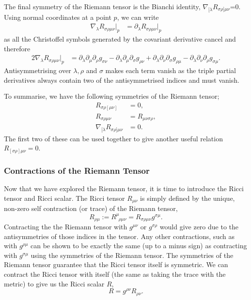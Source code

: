 The final symmetry of the Riemann tensor is the Bianchi identity, $\nabla_{[\lambda}R_{\sigma\rho]\mu\nu}$=0. Using normal coordinates at a point $p$, we can write
\begin{align}
\nabla_\lambda R_{\sigma\rho\mu\nu}\big|_p &= \partial_\lambda R_{\sigma\rho\mu\nu}\big|_p
\end{align}
as all the Christoffel symbols generated by the covariant derivative cancel and therefore
\begin{align}
2\nabla_\lambda R_{\sigma\rho\mu\nu}\big|_p &= \partial_\lambda \partial_{\mu} \partial_\rho g_{\sigma\nu} - \partial_\lambda \partial_{\mu} \partial_\sigma g_{\rho\nu} + \partial_\lambda \partial_{\nu} \partial_\sigma g_{\rho\mu} - \partial_\lambda \partial_{\nu} \partial_\rho g_{\sigma\mu}.
\end{align}
Antisymmetrising over $\lambda,\rho$ and $\sigma$ makes each term vanish as the triple partial derivatives always contain two of the antisymmetrised indices and must vanish.

To summarise, we have the following symmetries of the Riemann tensor; 
\begin{align}
R_{\sigma\rho[\mu\nu]}&=0, \\
R_{\sigma\rho\mu\nu}&=R_{\mu\nu\sigma\rho},\\
\nabla_{[\lambda}R_{\sigma\rho]\mu\nu}&=0. \label{intro:eq:bianchi}
\end{align}
 The first two of these can be used together to give another useful relation $R_{[\sigma\rho]\mu\nu} =0$.



\subsubsection{Contractions of the Riemann Tensor}
Now that we have explored the Riemann tensor, it is time to introduce the Ricci tensor and Ricci scalar. The Ricci tensor $R_{\mu\nu}$ is simply defined by the unique, non-zero self contraction (or trace) of the Riemann tensor,
\begin{equation}
R_{\rho\mu} := R^\mu_{\,\,\,\rho\mu\nu} = R_{\sigma\rho\mu\nu}g^{\sigma\mu}.
\end{equation}
Contracting the the Riemann tensor with $g^{\mu\nu}$ or $g^{\sigma\rho}$ would give zero due to the antisymmetries of those indices in the tensor. Any other contractions, such as with $g^{\rho\mu}$ can be shown to be exactly the same (up to a minus sign) as contracting with $g^{\sigma \mu}$ using the symmetries of the Riemann tensor. The symmetries of the Riemann tensor guarantee that the Ricci tensor itself is symmetric. We can contract the Ricci tensor with itself (the same as taking the trace with the metric) to give us the Ricci scalar $R$,
\begin{equation}
R=g^{\rho\nu}R_{\rho\nu}.
\end{equation}


